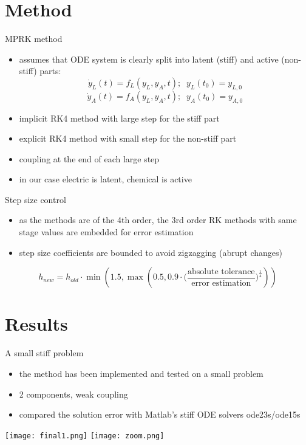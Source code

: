 \documentclass[11pt]{beamer}
\begin{document}
\section{Method}
\begin{frame}{MPRK method}
\begin{itemize}
\item assumes that ODE system is clearly split into latent (stiff) and active (non-stiff) parts:
\[\dot{y}_L(t) = f_L(y_L, y_A, t); \;\;y_L(t_0)=y_{L,0}\]
\[\dot{y}_A(t) = f_A(y_L, y_A, t); \;\;y_A(t_0)=y_{A,0}\]
\item implicit RK4 method with large step for the stiff part
\item explicit RK4 method with small step for the non-stiff part
\item coupling at the end of each large step
\item in our case electric is latent, chemical is active
\end{itemize}
\end{frame}

\begin{frame}{Step size control}
\begin{itemize}
\item as the methods are of the 4th order, the 3rd order RK methods with same stage values are embedded for error estimation
\item step size coefficients are bounded to avoid zigzagging (abrupt changes) 
\end{itemize}
\[ h_{new} = h_{old}\cdot \min(1.5, \max(0.5, 0.9 \cdot \Big(\frac{\text{absolute tolerance}}{\text{error estimation}}\Big)^\frac{1}{4}))\]
\end{frame}

\section{Results}
\begin{frame}{A small stiff problem}
\begin{itemize}
\item the method has been implemented and tested on a small problem
\item 2 components, weak coupling
\item compared the solution error with Matlab's stiff ODE solvers ode23s/ode15s
\end{itemize}
\texttt{[image: final1.png]} 
\texttt{[image: zoom.png]} 
\end{frame}
\end{document}
